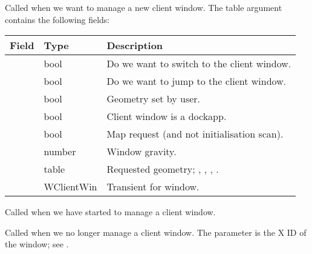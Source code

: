 
\begin{function}
    \begin{funcdesc}
      Called when we want to manage a new client window.
      The table argument contains the following fields:
      
      \begin{tabularx}{\linewidth}{llX}
          \hline
          Field & Type & Description \\
          \hline
          \var{switchto} & bool & Do we want to switch to the client window. \\
          \var{jumpto} & bool & Do we want to jump to the client window. \\
          \var{userpos} & bool & Geometry set by user. \\
          \var{dockapp} & bool & Client window is a dockapp. \\
          \var{maprq} & bool & Map request (and not initialisation scan). \\
          \var{gravity} & number & Window gravity. \\
          \var{geom} & table & Requested geometry; \var{x}, \var{y}, \var{w}, \var{h}.\\
          \var{tfor} & WClientWin & Transient for window.
      \end{tabularx}
    \end{funcdesc}
\end{function}


\begin{function}
    \begin{funcdesc}
      Called when we have started to manage a client window.
    \end{funcdesc}
\end{function}


\begin{function}
    \begin{funcdesc}
      Called when we no longer manage a client window. The parameter
      is the X ID of the window; see .
    \end{funcdesc}
\end{function}


